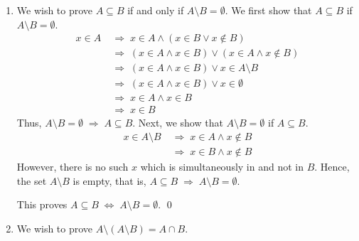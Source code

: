 \documentclass[10pt]{article}
\begin{document}
\begin{enumerate}
                \item
                We wish to prove $A \subseteq B$ if and only if $A \setminus B = \emptyset$. We first show that $A \subseteq B$ if $A \setminus B = \emptyset$.
                \begin{align*}
                        x \in A
                                \;&\Rightarrow\; x \in A \land (x \in B \lor x \notin B)\\
                                \;&\Rightarrow\; (x \in A \land x \in B) \lor (x \in A \land x \notin B)\\
                                \;&\Rightarrow\; (x \in A \land x \in B) \lor x \in A \setminus B\\
                                \;&\Rightarrow\; (x \in A \land x \in B) \lor x \in \emptyset   \tag{$A \setminus B = \emptyset$}\\
                                \;&\Rightarrow\; x \in A \land x \in B                          \tag{$x \in A$}\\
                                \;&\Rightarrow\; x \in B
                \end{align*}
                Thus, $A \setminus B = \emptyset \;\Rightarrow\; A \subseteq B$. Next, we show that $A \setminus B = \emptyset$ if $A \subseteq B$.
                \begin{align*}
                        x \in A \setminus B
                                \;&\Rightarrow\; x \in A \land x \notin B\\
                                \;&\Rightarrow\; x \in B \land x \notin B                   \tag{$A \subseteq B$}
                \end{align*}
                However, there is no such $x$ which is simultaneously in and not in $B$. Hence, the set $A \setminus B$ is empty, that is,
                $A \subseteq B \;\Rightarrow\; A \setminus B = \emptyset$.

                This proves $A \subseteq B \;\Leftrightarrow\; A \setminus B = \emptyset$. \qed


                \item
                We wish to prove $A \setminus (A \setminus B) = A \cap B$.
                

\end{enumerate}
\end{document}
